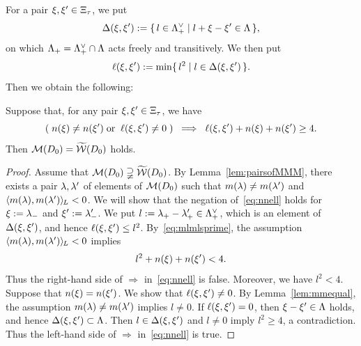 \documentclass{amsart} %
\begin{document}
%
%
For a pair $\xi, \xi^{\prime}\in \Xi_{\tau}$,
we put
%
\begin{equation}\label{eq:diffellset}
\Delta(\xi, \xi^{\prime}):=
\{\,{l\in \Lambda_{+}^{\vee}}\mid {l+\xi-\xi^{\prime}\in \Lambda} \,\},
\end{equation}
%
on which $\Lambda_{+}= \Lambda_{+}^{\vee}\cap\Lambda$ acts freely and transitively.
We then put 
%
\begin{equation}\label{eq:diffell}
\ell(\xi, \xi^{\prime}):=\min\{\,{l^2}\mid {l\in \Delta(\xi, \xi^{\prime})} \,\}.
\end{equation}
%
Then we obtain the following:
%
\begin{lemma}\label{lem:MMMtilwalls}
Suppose that, for any pair $\xi, \xi^{\prime}\in \Xi_{\tau}$,
we have
%
\begin{equation}\label{eq:nnell}
(\;n(\xi)\ne n(\xi^{\prime}) \; \textrm{\rm or}\; \;\ell(\xi, \xi^{\prime})\ne 0 \;)\;\;\Longrightarrow\;\; \ell(\xi, \xi^{\prime})+n(\xi)+n(\xi^{\prime})\ge 4.
\end{equation}
%
Then $\mathord{\mathcal{M}}(D_0)=\widetilde{\mathord{\mathcal{W}}} (D_0)$ holds.
\end{lemma}
%
\begin{proof}
Assume that $\mathord{\mathcal{M}}(D_0)\supsetneqq\widetilde{\mathord{\mathcal{W}}} (D_0)$.
By Lemma~\ref{lem:pairsofMMM},
there exists a pair $\lambda, \lambda^{\prime}$ of elements of $ \mathord{\mathcal{M}}(D_0)$
such that $m(\lambda)\ne m(\lambda^{\prime})$ and $ \langle m(\lambda), m(\lambda^{\prime}) \rangle_{\hskip -1pt L} <0$.
We will show that the negation of~\eqref{eq:nnell} holds for
$\xi:={\lambda}_{-}$ and $\xi^{\prime}:={\lambda}_{-}^{\prime}$.
We put $l:={\lambda}_{+}-{\lambda}_{+}^{\prime}\in \Lambda_{+}^{\vee}$,
which is an element of $\Delta(\xi, \xi^{\prime})$,
and hence $\ell(\xi, \xi^{\prime})\le l^2$.
By~\eqref{eq:mlmlsprime},
the assumption $ \langle m(\lambda), m(\lambda^{\prime}) \rangle_{\hskip -1pt L} <0$ implies 
%
\begin{equation*}\label{eq:lnn}
l^2+n(\xi)+n(\xi^{\prime})<4.
\end{equation*}
%
Thus the right-hand side of $\Longrightarrow$ in~\eqref{eq:nnell} is false.
Moreover, we have $l^2<4$.
Suppose that $n(\xi)=n(\xi^{\prime})$.
We show that $\ell(\xi, \xi^{\prime})\ne 0$.
By Lemma~\ref{lem:mmequal},
the assumption $m(\lambda)\ne m(\lambda^{\prime})$ implies $l\ne 0$.
If $\ell(\xi, \xi^{\prime})= 0$, then 
$\xi-\xi^{\prime}\in \Lambda$ holds, and hence 
$ \Delta(\xi, \xi^{\prime})\subset  \Lambda$.
Then $l\in\Delta(\xi, \xi^{\prime})$ and $l\ne 0$ 
imply $l^2\ge 4$, a contradiction.
Thus  the left-hand side of $\Longrightarrow$ in~\eqref{eq:nnell} is true.
\end{proof}
%
\end{document}

